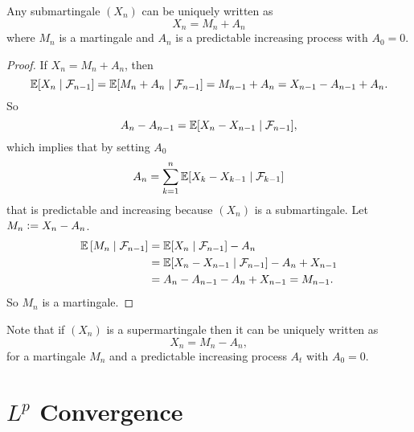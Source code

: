 \begin{thm}
    Any submartingale $(X_n)$ can be uniquely written as
    \begin{equation*}
        X_n = M_n + A_n
    \end{equation*}
    where $M_n$ is a martingale and $A_n$ is a predictable increasing process with $A_0 = 0$.
\end{thm}
\begin{proof}
    If $X_n = M_n + A_n$, then
    \begin{equation*}
        \mathbb{E}[X_n \mid \mathcal{F}_{n-1}] = \mathbb{E}[M_n + A_n \mid \mathcal{F}_{n-1}] = M_{n-1} + A_n = X_{n-1} - A_{n-1} +A_n.
    \end{equation*}
    So
    \begin{equation*}
        A_n - A_{n-1} = \mathbb{E}[X_n - X_{n-1} \mid \mathcal{F}_{n-1}],
    \end{equation*}
    which implies that by setting $A_0$
    \begin{equation*}
        A_n = \sum_{k = 1}^n \mathbb{E}[X_k - X_{k-1} \mid \mathcal{F}_{k-1}]
    \end{equation*}
    that is predictable and increasing because $(X_n)$ is a submartingale. Let $M_n \vcentcolon= X_n - A_n$.
    \begin{equation*}
        \begin{aligned}
            \mathbb{E}\left[M_n \mid \mathcal{F}_{n-1}\right] &= \mathbb{E}[X_n \mid \mathcal{F}_{n-1}] - A_n \\
            &= \mathbb{E}[X_n - X_{n-1} \mid \mathcal{F}_{n-1}] - A_n + X_{n-1} \\
            &= A_n - A_{n-1} - A_n + X_{n-1} = M_{n-1}.
        \end{aligned}
    \end{equation*}
    So $M_n$ is a martingale. \qedhere
\end{proof}
\begin{rmk}
    Note that if $(X_n)$ is a supermartingale then it can be uniquely written as
    \begin{equation*}
        X_n = M_n - A_n,
    \end{equation*}
    for a martingale $M_n$ and a predictable increasing process $A_t$ with $A_0 = 0$.
\end{rmk}

\section{\texorpdfstring{$L^p$}{Lp} Convergence}

